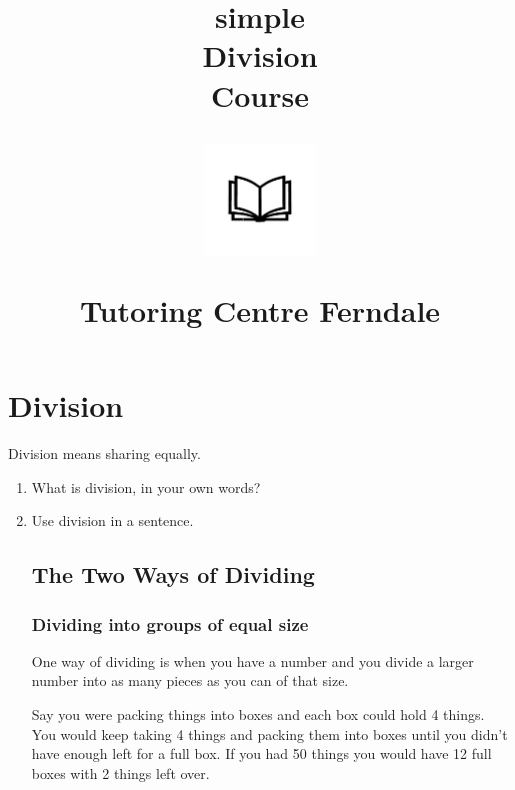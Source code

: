 \documentclass{article}
\author{}
\date{}
\title{simple\\Division\\Course\\
\vspace{28pt}
\begin{center}
\includegraphics[width=4em]{ApS_logo.png}
\end{center}
\begin{normalsize}Tutoring Centre Ferndale\end{normalsize}}
\begin{document}
\maketitle

\section{Division}

Division means sharing equally.\\

\begin{enumerate}

\item What is division, in your own words?
\item Use division in a sentence.

\subsection{The Two Ways of Dividing}

\subsubsection*{Dividing into groups of equal size}

One way of dividing is when you have a number and you divide a larger number into as many pieces as you can of that size.

Say you were packing things into boxes and each box could hold 4 things. You would keep taking 4 things and packing them into boxes until you didn't have enough left for a full box. If you had 50 things you would have 12 full boxes with 2 things left over.\\

\\


\end{enumerate}
\end{document}

